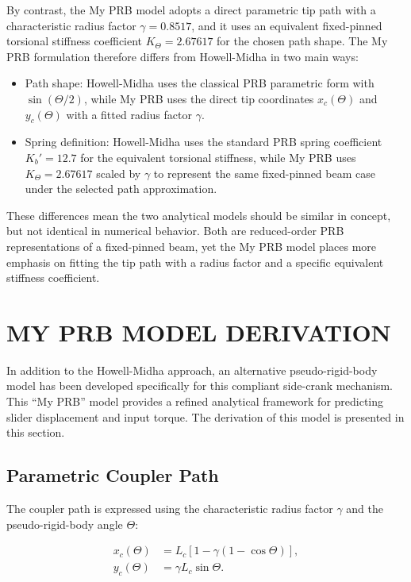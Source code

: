 \documentclass[colorlinks,upint,subscriptcorrection,varvw,hyphenate]{asmeconf}
\begin{document}
By contrast, the My PRB model adopts a direct parametric tip path with a characteristic radius factor $\gamma = 0.8517$, and it uses an equivalent fixed-pinned torsional stiffness coefficient $K_{\Theta} = 2.67617$ for the chosen path shape. The My PRB formulation therefore differs from Howell-Midha in two main ways:
\begin{itemize}
    \item Path shape: Howell-Midha uses the classical PRB parametric form with $\sin(\Theta/2)$, while My PRB uses the direct tip coordinates $x_c(\Theta)$ and $y_c(\Theta)$ with a fitted radius factor $\gamma$.
    \item Spring definition: Howell-Midha uses the standard PRB spring coefficient $K_b' = 12.7$ for the equivalent torsional stiffness, while My PRB uses $K_{\Theta} = 2.67617$ scaled by $\gamma$ to represent the same fixed-pinned beam case under the selected path approximation.
\end{itemize}

These differences mean the two analytical models should be similar in concept, but not identical in numerical behavior. Both are reduced-order PRB representations of a fixed-pinned beam, yet the My PRB model places more emphasis on fitting the tip path with a radius factor and a specific equivalent stiffness coefficient.

\section{MY PRB MODEL DERIVATION}
In addition to the Howell-Midha approach, an alternative pseudo-rigid-body model has been developed specifically for this compliant side-crank mechanism. This ``My PRB'' model provides a refined analytical framework for predicting slider displacement and input torque. The derivation of this model is presented in this section.

\subsection{Parametric Coupler Path}
The coupler path is expressed using the characteristic radius factor $\gamma$ and the pseudo-rigid-body angle $\Theta$:

\begin{align}
    x_c(\Theta) &= L_c \left[1 - \gamma\left(1 - \cos\Theta\right)\right], \\
    y_c(\Theta) &= \gamma L_c \sin\Theta.
\end{align}
\end{document}
